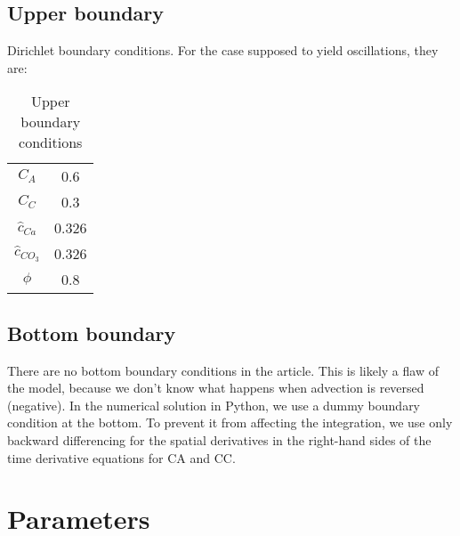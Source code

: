 \documentclass[11pt, letterpaper]{article}
\begin{document}
\subsection{Upper boundary}
Dirichlet boundary conditions. For the case supposed to yield oscillations, they are:

\begin{table}
    \centering
    \begin{tabular}{cc}
         $C_A$& 0.6\\
         $C_C$& 0.3\\
         $\hat{c}_{Ca}$& 0.326\\
         $\hat{c}_{CO_3}$& 0.326\\
         $\phi$& 0.8\\
    \end{tabular}
    \caption{Upper boundary conditions}
\end{table}
\subsection{Bottom boundary}
There are no bottom boundary conditions in the article. This is likely a flaw of the model, because we don't know what happens when advection is reversed (negative).
In the numerical solution in Python, we use a dummy boundary condition at the bottom. To prevent it from affecting the integration, we use only backward differencing for the spatial derivatives in the right-hand sides of the time derivative equations for CA and CC.

\section{Parameters}
\end{document}
